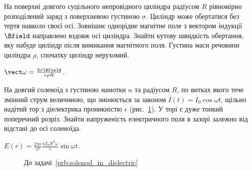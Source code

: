 \begin{problem}
На поверхні довгого суцільного непровідного циліндра радіусом $R$ рівномірно розподілений заряд з поверхневою густиною $\sigma$. Циліндр може обертатися без тертя навколо своєї осі. Зовнішнє однорідне магнітне поле з вектором індукції $\Bfield$ направлено вздовж осі циліндра. Знайти кутову швидкість обертання, яку набуде циліндр після вимикання магнітного поля. Густина маси речовини циліндра $\rho$, спочатку циліндр нерухомий.
\begin{solution}
	$\vect\omega = \frac{2\sigma\Bfield}{c\rho R}$.
\end{solution}
\end{problem}


\begin{problem}\label{prb:solenod_in_dielectric}
На довгий соленоїд з густиною намотки $n$ та радіусом $R$, по витках якого тече змінний струм величиною, що змінюється за законом $I(t) = I_0 \cos\omega t$, щільно надітий тор з діелектрика проникністю $\epsilon$ (рис.~\ref{solenod_in_dielectric}). У торі є дуже тонкий поперечний розріз. Знайти напруженість електричного поля в зазорі залежно від відстані до осі соленоїда. 
\begin{solution}
	$E(r) = \frac{2\pi\epsilon}{c^2}\frac{nI_0R^2\omega}{r}\sin\omega t$.
\end{solution}
\end{problem}
\begin{figure}[h!]\centering
	\caption{До задачі~\ref{prb:solenod_in_dielectric}}
	\label{solenod_in_dielectric}
\end{figure}



